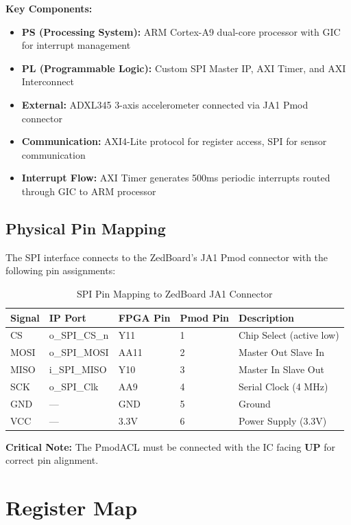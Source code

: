 \documentclass[11pt,a4paper]{article}
\begin{document}
\textbf{Key Components:}
\begin{itemize}[leftmargin=*]
    \item \textbf{PS (Processing System):} ARM Cortex-A9 dual-core processor with GIC for interrupt management
    \item \textbf{PL (Programmable Logic):} Custom SPI Master IP, AXI Timer, and AXI Interconnect
    \item \textbf{External:} ADXL345 3-axis accelerometer connected via JA1 Pmod connector
    \item \textbf{Communication:} AXI4-Lite protocol for register access, SPI for sensor communication
    \item \textbf{Interrupt Flow:} AXI Timer generates 500ms periodic interrupts routed through GIC to ARM processor
\end{itemize}

\subsection{Physical Pin Mapping}

The SPI interface connects to the ZedBoard's JA1 Pmod connector with the following pin assignments:

\begin{table}[H]
\centering
\caption{SPI Pin Mapping to ZedBoard JA1 Connector}
\label{tab:pin_mapping}
\begin{tabular}{@{}lllll@{}}
\toprule
\textbf{Signal} & \textbf{IP Port} & \textbf{FPGA Pin} & \textbf{Pmod Pin} & \textbf{Description} \\ \midrule
CS & o\_SPI\_CS\_n & Y11 & 1 & Chip Select (active low) \\
MOSI & o\_SPI\_MOSI & AA11 & 2 & Master Out Slave In \\
MISO & i\_SPI\_MISO & Y10 & 3 & Master In Slave Out \\
SCK & o\_SPI\_Clk & AA9 & 4 & Serial Clock (4 MHz) \\
GND & --- & GND & 5 & Ground \\
VCC & --- & 3.3V & 6 & Power Supply (3.3V) \\ \bottomrule
\end{tabular}
\end{table}

\textbf{Critical Note:} The PmodACL must be connected with the IC facing \textbf{UP} for correct pin alignment.

\section{Register Map}
\end{document}
